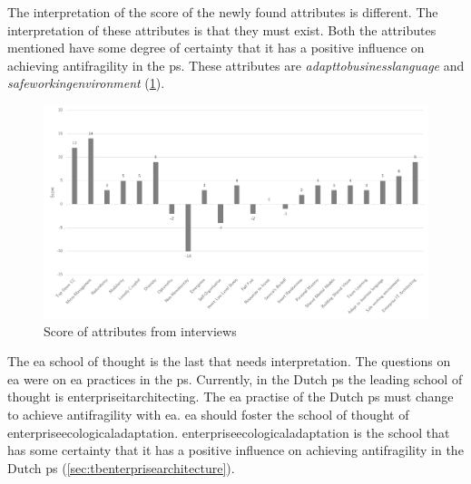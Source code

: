 The interpretation of the score of the newly found \glspl{attribute} is different. The interpretation of these \glspl{attribute} is that they must exist. Both the \glspl{attribute} mentioned have some degree of certainty that it has a positive influence on achieving \gls{antifragility} in the \gls{ps}. These attributes are \textit{\gls{adapttobusinesslanguage}} and \textit{\gls{safeworkingenvironment}} (\cref{fig:scoreofattributes}).
\begin{figure}[H]
	\centering
	\includegraphics[width=\textwidth]{images/scoreofattributes}
	\caption[Score of attributes from interviews]{Score of attributes from interviews}
	\label{fig:scoreofattributes}
\end{figure}
The \gls{ea} school of thought is the last that needs interpretation. The questions on \gls{ea} were on \gls{ea} practices in the \gls{ps}. Currently, in the Dutch \gls{ps} the leading school of thought is \gls{enterpriseitarchitecting}. The \gls{ea} practise of the Dutch \gls{ps} must change to achieve \gls{antifragility} with \gls{ea}. \gls{ea} should foster the school of thought of \gls{enterpriseecologicaladaptation}. \Gls{enterpriseecologicaladaptation} is the school that has some certainty that it has a positive influence on achieving \gls{antifragility} in the Dutch \gls{ps} (\cref{sec:tbenterprisearchitecture}).
